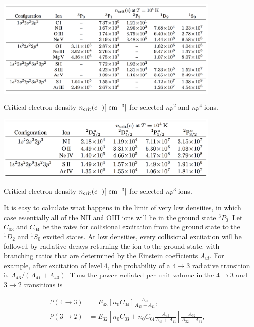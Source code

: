 \documentclass[a4paper,10pt]{article}
\begin{document}
\begin{table}[t!]
    \centering
    \includegraphics[width=11cm]{figures/ncrit_np2np4.png}
    \caption{\footnotesize{Critical electron density $n_{\rm crit}(e^-)[~{\rm cm^{-3}}]$ for selected $np^2$ and $np^4$ ions.}}
    \label{table:ncrit24}
\end{table}

\begin{table}[t!]
    \centering
    \includegraphics[width=11cm]{figures/ncrit_np3.png}
    \caption{\footnotesize{Critical electron density $n_{\rm crit}(e^-)[~{\rm cm^{-3}}]$ for selected $np^3$ ions.}}
    \label{table:ncrit3}
\end{table}

{\noindent}It is easy to calculate what happens in the limit of very low densities, in which case essentially all of the NII and OIII ions will be in the ground state $^3P_0$. Let $C_{03}$ and $C_{04}$ be the rates for collisional excitation from the ground state to the $^1D_2$ and $^1S_0$ excited states. At low densities, every collisional excitation will be followed by radiative decays returning the ion to the ground state, with branching ratios that are determined by the Einstein coefficients $A_{ul}$. For example, after excitation of level $4$, the probability of a $4\rightarrow3$ radiative transition is $A_{43}/(A_{41}+A_{43})$. Thus the power radiated per unit volume in the $4\rightarrow3$ and $3\rightarrow2$ transitions is

\begin{align*}
    P(4\rightarrow3) &= E_{43}[n_0C_{04}] \frac{A_{43}}{A_{43}+A_{41}}, \\
    P(3\rightarrow2) &= E_{32}\left[n_0C_{03} + n_0C_{04}\frac{A_{43}}{A_{43}+A_{41}}\right] \frac{A_{32}}{A_{32}+A_{31}},
\end{align*}
\end{document}
